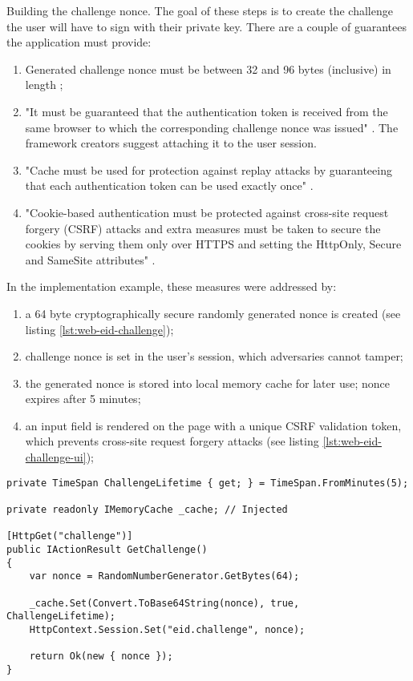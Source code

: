 Building the challenge nonce. The goal of these steps is to create the challenge the user will have to sign with their private key. There are a couple of guarantees the application must provide:
\begin{enumerate}
  \item Generated challenge nonce must be between 32 and 96 bytes (inclusive) in length \cite{ria-webeid-source-web-eid-app-authenticate};
  \item "It must be guaranteed that the authentication token is received from the same browser to which the corresponding challenge nonce was issued" \cite{ria-webeid-source-web-eid-authtoken-validation-java-readme}. The framework creators suggest attaching it to the user session.
  \item "Cache must be used for protection against replay attacks by guaranteeing that each authentication token can be used exactly once" \cite{ria-webeid-source-web-eid-authtoken-validation-java-readme}.
  \item "Cookie-based authentication must be protected against cross-site request forgery (CSRF) attacks and extra measures must be taken to secure the cookies by serving them only over HTTPS and setting the HttpOnly, Secure and SameSite attributes" \cite{ria-webeid-source-web-eid-authtoken-validation-java-readme}.
\end{enumerate}

In the implementation example, these measures were addressed by:
\begin{enumerate}
  \item a 64 byte cryptographically secure randomly generated nonce is created (see listing \ref{lst:web-eid-challenge});
  \item challenge nonce is set in the user's session, which adversaries cannot tamper;
  \item the generated nonce is stored into local memory cache for later use; nonce expires after 5 minutes;
  \item an input field is rendered on the page with a unique CSRF validation token, which prevents cross-site request forgery attacks (see listing \ref{lst:web-eid-challenge-ui});
\end{enumerate}

\begin{lstlisting}[caption={Web eID Challenge Endpoint}, label={lst:web-eid-challenge}]
private TimeSpan ChallengeLifetime { get; } = TimeSpan.FromMinutes(5);

private readonly IMemoryCache _cache; // Injected

[HttpGet("challenge")]
public IActionResult GetChallenge()
{
    var nonce = RandomNumberGenerator.GetBytes(64);

    _cache.Set(Convert.ToBase64String(nonce), true, ChallengeLifetime);
    HttpContext.Session.Set("eid.challenge", nonce);

    return Ok(new { nonce });
}
\end{lstlisting}


